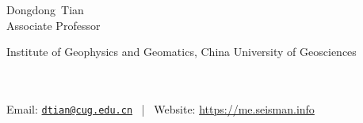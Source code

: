 \documentclass[11pt, a4paper]{article}
\makeatletter
\newcommand{\FirstName}{Dongdong}
\newcommand{\LastName}{Tian}
\newcommand{\MyName}{\FirstName\ \LastName}
\newcommand{\MyRole}{Associate Professor}
\newcommand{\Email}{dtian@cug.edu.cn}
\newcommand{\Website}{https://me.seisman.info}
\newcommand{\Affiliation}{
	Institute of Geophysics and Geomatics,
	China University of Geosciences
}
\newcommand{\Address}{
}
\newcommand{\makefield}[2]{\makebox[1.5em]{\color{MarkerColour!80!black}#1} #2}
\makeatother
\begin{document}
\thispagestyle{empty}

\begin{center}
    {\fontsize{36pt}{0}\selectfont \MyName}
    \\[0.5cm]
    {\fontsize{16pt}{0}\selectfont \MyRole}
    \\[0.3cm]
    {\fontsize{10pt}{0}\selectfont
        \Affiliation
        \\[0.2cm]
        \Address
        \\[0.08cm]
        Email: \href{mailto:\Email}{\texttt{\Email}}
        \, | \,
        Website: \url{\Website}
    }
\end{center}












%
\end{document}
